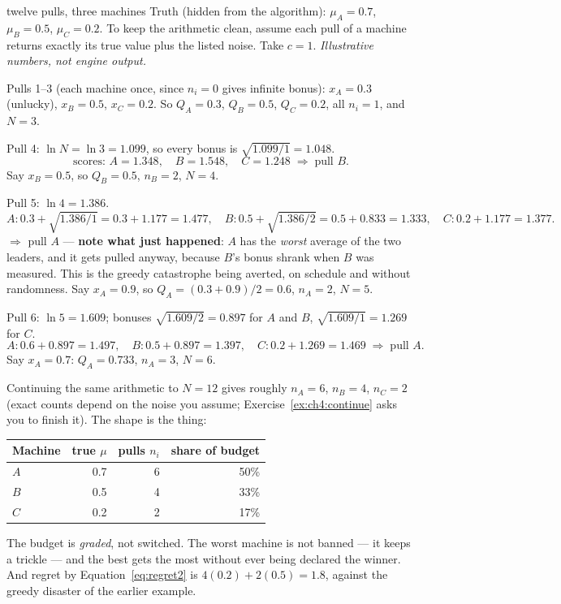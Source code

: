 \begin{worked}{twelve pulls, three machines}
Truth (hidden from the algorithm): $\mu_A = 0.7$, $\mu_B = 0.5$, $\mu_C = 0.2$. To keep the
arithmetic clean, assume each pull of a machine returns exactly its true value plus the
listed noise. Take $c = 1$. \emph{Illustrative numbers, not engine output.}

\smallskip
Pulls 1--3 (each machine once, since $n_i = 0$ gives infinite bonus):
$x_A = 0.3$ (unlucky), $x_B = 0.5$, $x_C = 0.2$. So $Q_A = 0.3$, $Q_B = 0.5$, $Q_C = 0.2$,
all $n_i = 1$, and $N = 3$.

\smallskip
Pull 4: $\ln N = \ln 3 = 1.099$, so every bonus is $\sqrt{1.099/1} = 1.048$.
\[
\text{scores: } A = 1.348,\quad B = 1.548,\quad C = 1.248 \;\Rightarrow\; \text{pull } B.
\]
Say $x_B = 0.5$, so $Q_B = 0.5$, $n_B = 2$, $N = 4$.

\smallskip
Pull 5: $\ln 4 = 1.386$.
\[
A: 0.3 + \sqrt{1.386/1} = 0.3+1.177 = 1.477,\quad
B: 0.5 + \sqrt{1.386/2} = 0.5+0.833 = 1.333,\quad
C: 0.2+1.177 = 1.377 .
\]
$\Rightarrow$ pull $A$ --- \textbf{note what just happened}: $A$ has the \emph{worst} average
of the two leaders, and it gets pulled anyway, because $B$'s bonus shrank when $B$ was
measured. This is the greedy catastrophe being averted, on schedule and without randomness.
Say $x_A = 0.9$, so $Q_A = (0.3+0.9)/2 = 0.6$, $n_A = 2$, $N = 5$.

\smallskip
Pull 6: $\ln 5 = 1.609$; bonuses $\sqrt{1.609/2} = 0.897$ for $A$ and $B$, $\sqrt{1.609/1} = 1.269$ for $C$.
\[
A: 0.6+0.897 = 1.497,\quad B: 0.5+0.897 = 1.397,\quad C: 0.2+1.269 = 1.469 \;\Rightarrow\;
\text{pull } A .
\]
Say $x_A = 0.7$: $Q_A = 0.733$, $n_A = 3$, $N = 6$.

\smallskip
Continuing the same arithmetic to $N = 12$ gives roughly $n_A = 6$, $n_B = 4$, $n_C = 2$
(exact counts depend on the noise you assume; Exercise~\ref{ex:ch4:continue} asks you to
finish it). The shape is the thing:

\begin{center}
\begin{tabular}{@{}lrrr@{}}
\toprule
Machine & true $\mu$ & pulls $n_i$ & share of budget \\
\midrule
$A$ & 0.7 & 6 & 50\% \\
$B$ & 0.5 & 4 & 33\% \\
$C$ & 0.2 & 2 & 17\% \\
\bottomrule
\end{tabular}
\end{center}

The budget is \emph{graded}, not switched. The worst machine is not banned --- it keeps a
trickle --- and the best gets the most without ever being declared the winner. And regret by
Equation~\eqref{eq:regret2} is $4(0.2) + 2(0.5) = 1.8$, against the greedy disaster of the
earlier example.
\end{worked}

